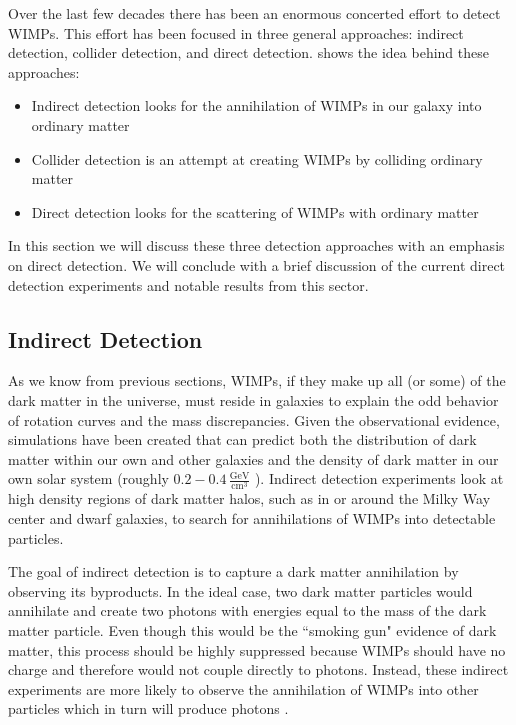 Over the last few decades there has been an enormous concerted effort to detect WIMPs.  This effort has been focused in three general approaches: indirect detection, collider detection, and direct detection.   shows the idea behind these approaches:

\begin{itemize}
        \item Indirect detection looks for the annihilation of WIMPs in our galaxy into ordinary matter
        \item Collider detection is an attempt at creating WIMPs by colliding ordinary matter
        \item Direct detection looks for the scattering of WIMPs with ordinary matter
\end{itemize}

In this section we will discuss these three detection approaches with an emphasis on direct detection.  We will conclude with a brief discussion of the current direct detection experiments and notable results from this sector.

\subsection{Indirect Detection}
\label{sec:indirect_detection}

As we know from previous sections, WIMPs, if they make up all (or some) of the dark matter in the universe, must reside in galaxies to explain the odd behavior of rotation curves and the mass discrepancies.  Given the observational evidence, simulations have been created that can predict both the distribution of dark matter within our own and other galaxies \cite{stadel2009quantifying, maccio2007concentration} and the density of dark matter in our own solar system (roughly $0.2 - 0.4 \, \frac{\textrm{GeV}}{\textrm{cm}^3}$ \cite{read2014local}).  Indirect detection experiments look at high density regions of dark matter halos, such as in or around the Milky Way center and dwarf galaxies, to search for annihilations of WIMPs into detectable particles.

The goal of indirect detection is to capture a dark matter annihilation by observing its byproducts.  In the ideal case, two dark matter particles would annihilate and create two photons with energies equal to the mass of the dark matter particle.  Even though this would be the ``smoking gun" evidence of dark matter, this process should be highly suppressed because WIMPs should have no charge and therefore would not couple directly to photons.  Instead, these indirect experiments are more likely to observe the annihilation of WIMPs into other particles which in turn will produce photons \cite{bi2013status}.  

